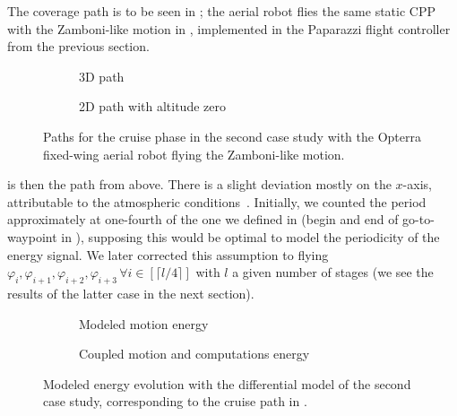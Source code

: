 The coverage path is to be seen in ; the aerial robot flies the same static CPP with the Zamboni-like motion in , implemented in the Paparazzi flight controller from the previous section. 
\begin{figure}[h!]
  \centering
  \selectfont
  \footnotesize
  \begin{subfigure}[c]{0.475\textwidth}
    \centering
    
    \caption{3D path}
    \label{fig:cruise-path}
  \end{subfigure}
  \begin{subfigure}[c]{0.475\textwidth}
    \centering
    
    \vspace*{1.1ex}
    \caption{2D path with altitude zero}
    \label{fig:cruise-xy}
  \end{subfigure}
  \caption[Paths for the cruise phase]{Paths for the cruise phase in the second case study with the Opterra fixed-wing aerial robot flying the Zamboni-like motion.}
  \label{fig:cruise-prelim}
\end{figure}
 is then the path from above. There is a slight deviation mostly on the $x$-axis, attributable to the atmospheric conditions~\citep{seewald2020mechanical}. Initially, we counted the period approximately at one-fourth of the one we defined in  (begin and end of go-to-waypoint in ), supposing this would be optimal to model the periodicity of the energy signal. We later corrected this assumption to flying $\varphi_{i},\varphi_{i+1},\varphi_{i+2},\varphi_{i+3}\,\forall i\in[\lceil l/4\rceil]$ with $l$ a given number of stages (we see the results of the latter case in the next section). 
\begin{figure}[h!]
  \centering
  \selectfont
  \footnotesize
  \begin{subfigure}[c]{0.43\textwidth}
    \centering
    
    \caption{Modeled motion energy}
    \label{fig:cruise-energy}
  \end{subfigure}
  \begin{subfigure}[c]{0.45\textwidth}
    \centering
    
    \caption{Coupled motion and computations energy}
    \label{fig:cruise-merge}
  \end{subfigure}
  \caption[Modeled energy evolution with the differential model]{Modeled energy evolution with the differential model of the second case study, corresponding to the cruise path in .}
  \label{fig:cruise-energies}
\end{figure}
